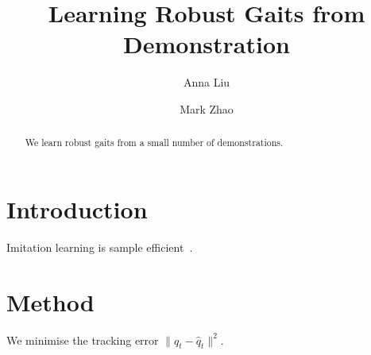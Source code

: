\documentclass[runningheads]{llncs}
\begin{document}
\title{Learning Robust Gaits from Demonstration}
\author{Anna Liu \and Mark Zhao}
\maketitle
\begin{abstract}
We learn robust gaits from a small number of demonstrations.
\end{abstract}
\section{Introduction}
Imitation learning is sample efficient~\cite{smith2020}.
\section{Method}
We minimise the tracking error $\|q_t - \hat{q}_t\|^2$.


\end{document}
